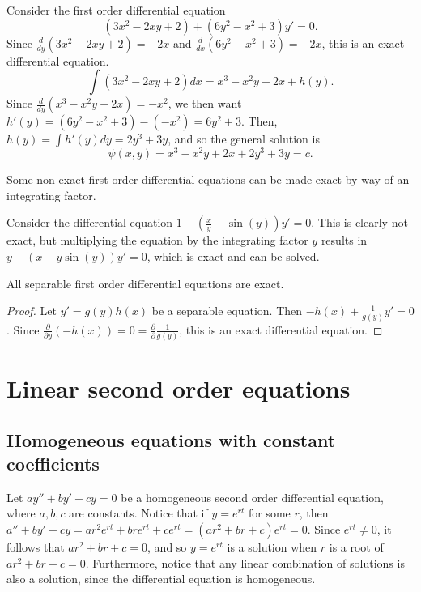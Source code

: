 \begin{exmp}
    Consider the first order differential equation \[\left(3x^2 - 2xy + 2\right) + \left(6y^2 - x^2 + 3\right)y' = 0.\] Since $\frac{d}{dy}\left(3x^2 - 2xy + 2\right) = -2x$ and $\frac{d}{dx}\left(6y^2 - x^2 + 3\right) = -2x$, this is an exact differential equation.
    \[\int \left(3x^2 - 2xy + 2\right)dx = x^3 - x^2y + 2x + h(y).\] Since $\frac{d}{dy}\left(x^3 - x^2y + 2x\right) = -x^2$, we then want $h'(y) = \left(6y^2 - x^2 + 3\right) - (-x^2) = 6y^2 + 3$. Then, $h(y) = \int h'(y)dy = 2y^3 + 3y$, and so the general solution is \[\psi(x, y) = x^3 - x^2y + 2x + 2y^3 + 3y = c.\]
\end{exmp}

\begin{rmk}
    Some non-exact first order differential equations can be made exact by way of an integrating factor.
\end{rmk}

\begin{exmp}
    Consider the differential equation $1 + \left(\frac{x}{y}- \sin(y)\right)y' = 0$. This is clearly not exact, but multiplying the equation by the integrating factor $y$ results in $y + \left(x - y\sin(y)\right)y' = 0$, which is exact and can be solved.
\end{exmp}

\begin{prop}
    All separable first order differential equations are exact.
\end{prop}

\begin{proof}
    Let $y' = g(y)h(x)$ be a separable equation. Then $-h(x) + \frac{1}{g(y)}y' = 0$. Since $\frac{\partial}{\partial y}\left(-h(x)\right) = 0 = \frac{\partial}{\partial}\frac{1}{g(y)}$, this is an exact differential equation.
\end{proof}

\section{Linear second order equations}

\subsection{Homogeneous equations with constant coefficients}

Let $ay'' + by' + cy = 0$ be a homogeneous second order differential equation, where $a, b, c$ are constants. Notice that if $y = e^{rt}$ for some $r$, then $a'' + by' + cy = ar^2e^{rt} + bre^{rt} + ce^{rt} = (ar^2 + br + c)e^{rt} = 0$. Since $e^{rt} \neq 0$, it follows that $ar^2 + br + c = 0$, and so $y = e^{rt}$ is a solution when $r$ is a root of $ar^2 + br + c = 0$. Furthermore, notice that any linear combination of solutions is also a solution, since the differential equation is homogeneous.

